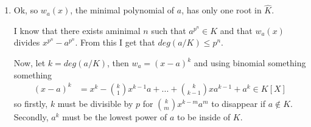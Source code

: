 \documentclass{article}
\begin{document}
\begin{enumerate}[label=(\alph*), leftmargin=*]
    \item Ok, so $w_a(x)$, the minimal polynomial of $a$, has only one root in $\hat{K}$.

    I know that there exists aminimal $n$ such that $a^{p^n}\in K$ and that $w_a(x)$ divides $x^{p^n}-a^{p^n}$. From this I get that $deg(a/K)\leq p^n$.

    Now, let $k=deg(a/K)$, then $w_a=(x-a)^k$ and using binomial something something
    \begin{align*}
        (x-a)^k&=x^k-\binom{k}{1}x^{k-1}a+...+\binom{k}{k-1}xa^{k-1}+a^k\in K[X]
    \end{align*}
    so firstly, $k$ must be divisible by $p$ for $\binom{k}{m}x^{k-m}a^m$ to disappear if $a\notin K$. Secondly, $a^k$ must be the lowest power of $a$ to be inside of $K$.
\end{enumerate}
\end{document}
